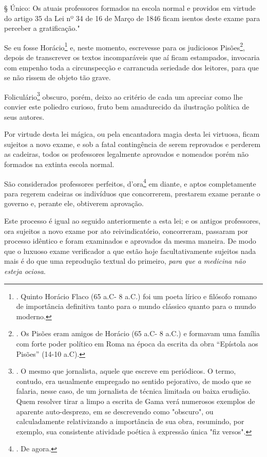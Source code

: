 § Único: Os atuais professores formados na escola normal e providos em
virtude do artigo 35 da Lei nº 34 de 16 de Março de 1846 ficam isentos
deste exame para perceber a gratificação."

Se eu fosse Horácio\footnote{. Quinto Horácio Flaco (65 a.C- 8 a.C.) foi
  um poeta lírico e filósofo romano de importância definitiva tanto para
  o mundo clássico quanto para o mundo moderno.} e, neste momento,
escrevesse para os judiciosos Pisões\footnote{. Os Pisões eram amigos de
  Horácio (65 a.C- 8 a.C.) e formavam uma família com forte poder
  político em Roma na época da escrita da obra ``Epístola aos Pisões''
  (14-10 a.C).}, depois de transcrever os textos incomparáveis que aí
ficam estampados, invocaria com empenho toda a circunspecção e
carrancuda seriedade dos leitores, para que se não rissem de objeto tão
grave.

Foliculário\footnote{. O mesmo que jornalista, aquele que escreve em
  periódicos. O termo, contudo, era usualmente empregado no sentido
  pejorativo, de modo que se falaria, nesse caso, de um jornalista de
  técnica limitada ou baixa erudição. Quem resolver tirar a limpo a
  escrita de Gama verá numerosos exemplos de aparente auto-desprezo, em
  se descrevendo como "obscuro", ou calculadamente relativizando a
  importância de sua obra, resumindo, por exemplo, sua consistente
  atividade poética à expressão única "fiz versos".} obscuro, porém,
deixo ao critério de cada um apreciar como lhe convier este poliedro
curioso, fruto bem amadurecido da ilustração política de seus autores.

Por virtude desta lei mágica, ou pela encantadora magia desta lei
virtuosa, ficam sujeitos a novo exame, e sob a fatal contingência de
serem reprovados e perderem as cadeiras, todos os professores legalmente
aprovados e nomeados porém não formados na extinta escola normal.

São considerados professores perfeitos, d'ora\footnote{. De agora.} em
diante, e aptos completamente para regerem cadeiras os indivíduos que
concorrerem, prestarem exame perante o governo e, perante ele, obtiverem
aprovação.

Este processo é igual ao seguido anteriormente a esta lei; e os antigos
professores, ora sujeitos a novo exame por ato reivindicatório,
concorreram, passaram por processo idêntico e foram examinados e
aprovados da mesma maneira. De modo que o luxuoso exame verificador a
que estão hoje facultativamente sujeitos nada mais é do que uma
reprodução textual do primeiro, \emph{para que a medicina não esteja
ociosa}.

